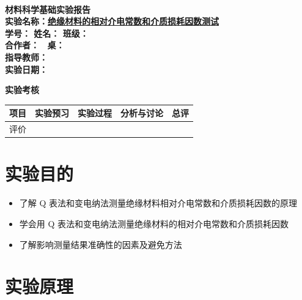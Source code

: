 \documentclass[a4paper,utf8]{article}
\begin{document}
\begin{center}
    {\mbox{}\\[7em]\bfseries\songti%
    材料科学基础实验报告}\\[34mm]
    {\bfseries\songti
    实验名称：\uline{\hfill\mbox{绝缘材料的相对介电常数和介质损耗因数测试}\hfill} \\[2.9mm]
    学\quad 号：\uline{}\hfill
    姓\quad 名：\uline{}\hfill
    班\quad 级：\uline{} \\[2.9mm]
    合作者：\uline{}\enspace~
    桌：\uline{\makebox[25mm]{}}\hfill\mbox{}\\[2.9mm]
    指导教师：\uline{}\hfill\mbox{} \\[2.9mm]
    实验日期：\uline{}\hfill\mbox{} \\[58.7mm]
    } 
    {\bfseries\songti
    实验考核\\[3mm]
    \extrarowheight=3mm
    \begin{tabularx}{150mm}{|X|X|X|X|X|}\hline
        \hfil 项目 \hfil  & \hfil 实验预习 \hfil & \hfil 实验过程 \hfil & \hfil 分析与讨论 \hfil & \hfil 总评 \hfil \\[3mm] \hline
        \hfil 评价 \hfil &  &  &  &  \\[3mm] \hline
    \end{tabularx}
    }
\end{center}\newpage
\section{实验目的}
    \begin{itemize}
        \item 了解 Q 表法和变电纳法测量绝缘材料相对介电常数和介质损耗因数的原理
        \item 学会用 Q 表法和变电纳法测量绝缘材料的相对介电常数和介质损耗因数
        \item 了解影响测量结果准确性的因素及避免方法
    \end{itemize}
\section{实验原理}%
\end{document}
